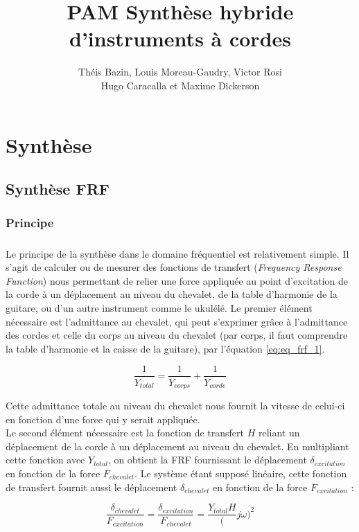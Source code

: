 \documentclass[a4paper,10pt]{article}
\title{PAM Synthèse hybride d'instruments à cordes}
\author{Théis Bazin, Louis Moreau-Gaudry, Victor Rosi \\ Hugo Caracalla et Maxime Dickerson}
\begin{document}
\chapter{Synthèse}
\section{Synthèse FRF}

\subsection{Principe}
\paragraph*{} 

Le principe de la synthèse dans le domaine fréquentiel est relativement simple.
Il s'agit de calculer ou de mesurer des fonctions de transfert
(\textit{Frequency Response Function}) nous permettant de relier une force
appliquée au point d'excitation de la corde à un déplacement au niveau du
chevalet, de la table d'harmonie de la guitare, ou d'un autre instrument comme
le ukulélé. Le premier élément nécessaire est l'admittance au chevalet, qui
peut s'exprimer grâce à l'admittance des cordes et celle du corps au niveau du
chevalet (par corps, il faut comprendre la table d'harmonie et la caisse de la
guitare), par l'équation \ref{eq:eq_frf_1}.

\begin{equation}
  \frac{1}{Y_{total}} = \frac{1}{Y_{corps}} + \frac{1}{Y_{corde}}
  \label{eq:eq_frf_1}
\end{equation}

Cette admittance totale au niveau du chevalet nous fournit la vitesse de
celui-ci en fonction d'une force qui y serait appliquée. \\

Le second élément nécessaire est la fonction de transfert $H$ reliant un
déplacement de la corde à un déplacement au niveau du chevalet. En multipliant
cette fonction avec $Y_{total}$, on obtient la FRF fournissant le déplacement
$\delta_{excitation}$ en fonction de la force $F_{chevalet}$. Le système étant
supposé linéaire, cette fonction de transfert fournit aussi le déplacement
$\delta_{chevalet}$ en fonction de la force $F_{excitation}$ :

\begin{equation}
  \frac{\delta_{chevalet}}{F_{excitation}} = \frac{\delta_{excitation}}{F_{chevalet}} = \frac{Y_{total}H}({j\omega})^2
  \label{eq:eq_frf_2}
\end{equation}
\end{document}
